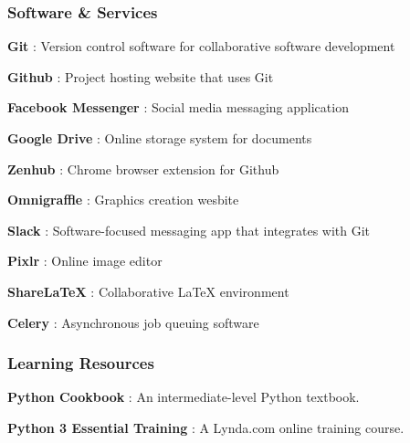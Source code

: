 \documentclass{article}
\begin{document}
\subsubsection*{Software \& Services}
\begin{itemize*}
     \item \textbf{Git} \cite{git}: Version control software for collaborative software development
     \item \textbf{Github} \cite{github}: Project hosting website that uses Git
     \item \textbf{Facebook Messenger} \cite{messenger}: Social media messaging application
     \item \textbf{Google Drive} \cite{drive}: Online storage system for documents
     \item \textbf{Zenhub} \cite{zenhub}: Chrome browser extension for Github
     \item \textbf{Omnigraffle} \cite{omnigraffle}: Graphics creation wesbite
     \item \textbf{Slack} \cite{slack}: Software-focused messaging app that integrates with Git
     \item \textbf{Pixlr} \cite{pixlr}: Online image editor
     \item \textbf{ShareLaTeX} \cite{sharelatex}: Collaborative LaTeX environment
     \item \textbf{Celery} \cite{celery}: Asynchronous job queuing software
\end{itemize*}

\subsubsection*{Learning Resources}
\begin{itemize*}
    \item \textbf{Python Cookbook} \cite{cookbook}: An intermediate-level Python textbook.
    \item \textbf{Python 3 Essential Training} \cite{lynda}: A Lynda.com online training course.
\end{itemize*}


\newpage
\end{document}
